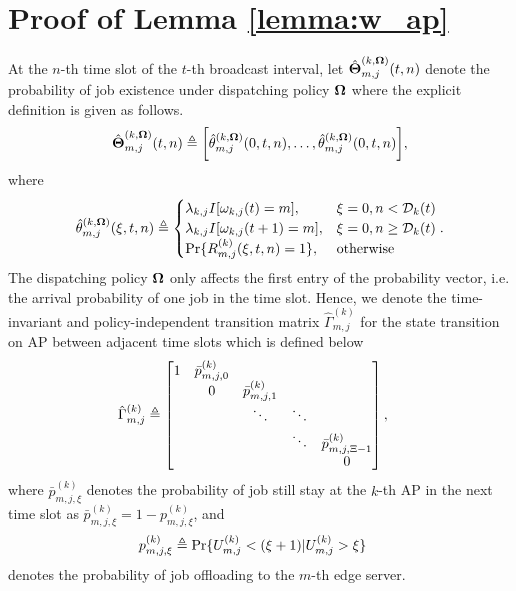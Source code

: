 \appendices
\section{ Proof of Lemma \ref{lemma:w_ap} }
\label{append_1}
At the $n$-th time slot of the $t$-th broadcast interval, let $\hat{\boldsymbol{\Theta}}^{(k,\boldsymbol{\Omega})}_{m,j}(t,n)$ denote the probability of job existence under dispatching policy $\boldsymbol{\Omega}$ where the explicit definition is given as follows.
\begin{align}
    \hat{\boldsymbol{\Theta}}^{(k,\boldsymbol{\Omega})}_{m,j}(t,n) \triangleq \bigg[
        \hat{\theta}^{(k,\boldsymbol{\Omega})}_{m,j}(0,t,n),
        \dots,
        \hat{\theta}^{(k,\boldsymbol{\Omega})}_{m,j}(0,t,n)
    \bigg],
\end{align}
where
{\small
\begin{align}
    \hat{\theta}^{(k,\boldsymbol{\Omega})}_{m,j}(\xi,t,n) \triangleq
    \begin{cases}
        \lambda_{k,j} I[\omega_{k,j}(t)=m], &\xi=0, n < \mathcal{D}_{k}(t)
        \\
        \lambda_{k,j} I[\omega_{k,j}(t+1)=m], &\xi=0, n \geq \mathcal{D}_{k}(t) 
        \\
        \Pr\{R^{(k)}_{m,j}(\xi,t,n)=1\}, & \text{otherwise}
    \end{cases}.
\end{align}
}
The dispatching policy $\boldsymbol{\Omega}$ only affects the first entry of the probability vector, i.e. the arrival probability of one job in the time slot.
Hence, we denote the time-invariant and policy-independent transition matrix $\hat{\Gamma}^{(k)}_{m,j}$ for the state transition on AP between adjacent time slots which is defined below
\begin{align}
    \hat{\Gamma}^{(k)}_{m,j} &\triangleq
    \begin{bmatrix}
        1 & \bar{p}^{(k)}_{m,j,0} &                       &        &                           \\
        & 0                     & \bar{p}^{(k)}_{m,j,1} &        &                           \\
        &                       & \ddots                & \ddots &                           \\
        &                       &                       & \ddots & \bar{p}^{(k)}_{m,j,\Xi-1} \\
        &                       &                       &        & 0                         \\
    \end{bmatrix},
\end{align}
where $\bar{p}^{(k)}_{m,j,\xi}$ denotes the probability of job still stay at the $k$-th AP in the next time slot as $\bar{p}^{(k)}_{m,j,\xi} = 1 - p^{(k)}_{m,j,\xi}$, and
\begin{align}
    p^{(k)}_{m,j,\xi} &\triangleq \Pr\{U^{(k)}_{m,j} < (\xi+1) | U^{(k)}_{m,j}>\xi\}
\end{align}
denotes the probability of job offloading to the $m$-th edge server.

